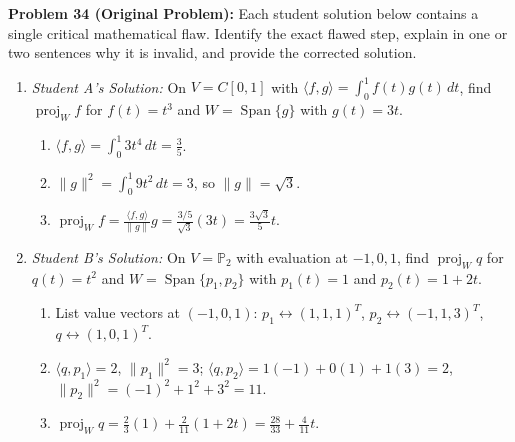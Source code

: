 \documentclass[11pt, letterpaper]{article}
\theoremstyle{definition}
\theoremstyle{remark}
\begin{document}
\textbf{Problem 34 (Original Problem):} Each student solution below contains a single critical mathematical flaw. Identify the exact flawed step, explain in one or two sentences why it is invalid, and provide the corrected solution.
\begin{enumerate}[label=(\alph*)]
    \item \emph{Student A's Solution:} On $V = C[0, 1]$ with $\langle f, g \rangle = \int_0^1 f(t)g(t)\,dt$, find $\operatorname{proj}_W f$ for $f(t) = t^3$ and $W = \operatorname{Span}\{g\}$ with $g(t) = 3t$.
    \begin{enumerate}[label=Step \arabic*:]
        \item $\langle f, g \rangle = \int_0^1 3t^4\,dt = \frac{3}{5}$.
        \item $\|g\|^2 = \int_0^1 9t^2\,dt = 3$, so $\|g\| = \sqrt{3}$.
        \item $\operatorname{proj}_W f = \frac{\langle f, g \rangle}{\|g\|} g = \frac{3/5}{\sqrt{3}}(3t) = \frac{3\sqrt{3}}{5}t$.
    \end{enumerate}
    \item \emph{Student B's Solution:} On $V = \mathbb{P}_2$ with evaluation at $-1, 0, 1$, find $\operatorname{proj}_W q$ for $q(t) = t^2$ and $W = \operatorname{Span}\{p_1, p_2\}$ with $p_1(t) = 1$ and $p_2(t) = 1 + 2t$.
    \begin{enumerate}[label=Step \arabic*:]
        \item List value vectors at $(-1, 0, 1)$: $p_1 \leftrightarrow (1, 1, 1)^T$, $p_2 \leftrightarrow (-1, 1, 3)^T$, $q \leftrightarrow (1, 0, 1)^T$.
        \item $\langle q, p_1 \rangle = 2$, $\|p_1\|^2 = 3$; $\langle q, p_2 \rangle = 1(-1) + 0(1) + 1(3) = 2$, $\|p_2\|^2 = (-1)^2 + 1^2 + 3^2 = 11$.
        \item $\operatorname{proj}_W q = \frac{2}{3}(1) + \frac{2}{11}(1 + 2t) = \frac{28}{33} + \frac{4}{11}t$.
    \end{enumerate}
\end{enumerate}
\end{document}

